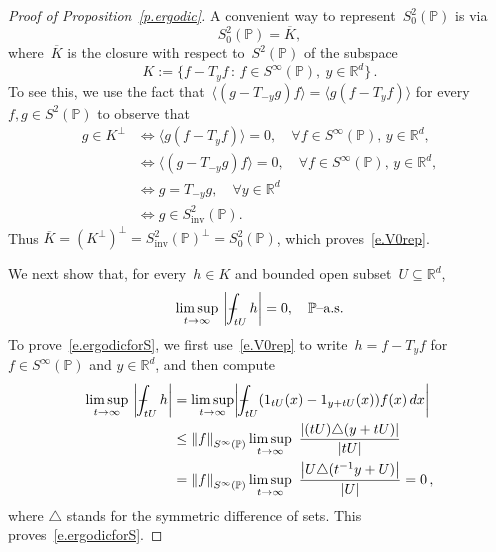 \documentclass[11pt]{article} %
\numberwithin{equation}{section}
\theoremstyle{definition}
\let\originalleft\left
\let\originalright\right
\renewcommand{\left}{\mathopen{}\mathclose\bgroup\originalleft}
\renewcommand{\right}{\aftergroup\egroup\originalright}
\newcommand*{\Rd}{\ensuremath{\mathbb{R}^d}}
\newcommand{\inv}{\mathrm{inv}}
\renewcommand{\P}{\mathbb{P}}
\newcommand{\indc}{1}
\def\Xint#1{\mathchoice
{\XXint\displaystyle\textstyle{#1}}%
{\XXint\textstyle\scriptstyle{#1}}%
{\XXint\scriptstyle\scriptscriptstyle{#1}}%
{\XXint\scriptscriptstyle\scriptscriptstyle{#1}}%
\!\int}
\def\XXint#1#2#3{{\setbox0=\hbox{$#1{#2#3}{\int}$}
\vcenter{\hbox{$#2#3$}}\kern-.5\wd0}}
\def\fint{\Xint-}
\begin{document}
\begin{proof}[Proof of Proposition~\ref{p.ergodic}]
A convenient way to represent~$S^2_{0}(\P)$ is via
\begin{equation}
\label{e.V0rep}
S^2_0(\P) = \overline{K},
\end{equation}
where~$\overline{K}$ is the closure with respect to~$S^2(\P)$ of the subspace 
\begin{equation*}
K:= \bigl\{ f - T_y f \,:\, f\in S^\infty(\P), \ y \in\Rd \bigr\}\,.
\end{equation*}
To see this, we use the fact that~$\bigl\langle (g - T_{-y}g) f  \bigr\rangle
=
\bigl\langle g(f-T_{y}f) \bigr\rangle$ for every~$f,g\in S^2(\P)$ to observe that 
\begin{align*}
g \in K^\perp
&
\iff 
\bigl\langle g(f-T_{y}f) \bigr\rangle 
= 0, \quad \forall f\in S^\infty(\P), \, y\in \Rd, 
\\ & 
\iff
\bigl\langle (g - T_{-y}g) f  \bigr\rangle 
= 0, \quad \forall f\in S^\infty(\P), \, y\in \Rd, 
\\ & 
\iff
g = T_{-y}g, \quad \forall y\in\Rd
\\ & 
\iff 
g\in S^2_{\inv}(\P). 
\end{align*}
Thus $\overline{K} = (K^{\perp})^\perp = S^2_{\inv}(\P)^\perp = S^2_{0}(\P)$, which proves~\eqref{e.V0rep}. 

\smallskip

We next show that, for every~$h\in K$ and bounded open subset~$U\subseteq\Rd$,
\begin{equation}
\label{e.ergodicforS}
\limsup_{t \to \infty} \
\left| \fint_{tU} h \right| = 0, \quad \mbox{$\P$--a.s.}
\end{equation}
To prove~\eqref{e.ergodicforS}, we first use~\eqref{e.V0rep} to write~$h= f-T_yf$ for~$f\in S^\infty(\P)$ and $y\in\Rd$, and then compute
\begin{align*}
\limsup_{t\to \infty} \
\left| \fint_{tU} h  \right|
&
= 
\limsup_{t\to \infty} 
\left| \fint_{tU} (\indc_{tU}(x) -  \indc_{y+tU}(x)) f(x)  \,dx \right| 
\\ & 
\leq 
\left\| f \right\|_{S^\infty(\P)}
\limsup_{t\to \infty} \
\frac{\left| (tU) \triangle (y+tU) \right|}{|tU|}
\\ &
=
\left\| f \right\|_{S^\infty(\P)}
\limsup_{t\to \infty} \
\frac{\left| U \triangle (t^{-1}y+U) \right| }{|U|}
= 0 \,,
\end{align*}
where $\triangle$ stands for the symmetric difference of sets. This proves~\eqref{e.ergodicforS}. 


\end{proof}
\end{document}
